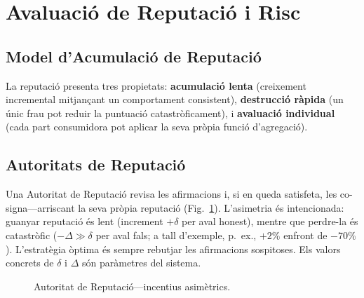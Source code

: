 \documentclass[11pt,a4paper,twocolumn]{article}
\begin{document}
\section{Avaluació de Reputació i Risc}

\subsection{Model d'Acumulació de Reputació}

La reputació presenta tres propietats: \textbf{acumulació lenta} (creixement incremental mitjançant un comportament consistent), \textbf{destrucció ràpida} (un únic frau pot reduir la puntuació catastròficament), i \textbf{avaluació individual} (cada part consumidora pot aplicar la seva pròpia funció d'agregació).

\subsection{Autoritats de Reputació}

Una Autoritat de Reputació revisa les afirmacions i, si en queda satisfeta, les co-signa---arriscant la seva pròpia reputació (Fig.~\ref{fig:authority}). L'asimetria és intencionada: guanyar reputació és lent (increment $+\delta$ per aval honest), mentre que perdre-la és catastròfic ($-\Delta \gg \delta$ per aval fals; a tall d'exemple, p.\ ex., $+2\%$ enfront de $-70\%$). L'estratègia òptima és sempre rebutjar les afirmacions sospitoses. Els valors concrets de $\delta$ i $\Delta$ són paràmetres del sistema.

\begin{figure}[ht]
\centering
{}
\caption{Autoritat de Reputació---incentius asimètrics.}
\label{fig:authority}
\end{figure}
\end{document}
